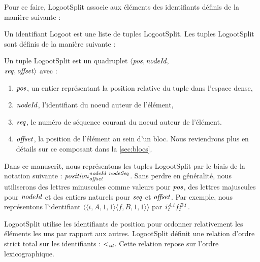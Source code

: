 Pour ce faire, LogootSplit associe aux éléments des identifiants définis de la manière suivante :

\begin{definition}
  Un identifiant Logoot est une liste de tuples LogootSplit.
  Les tuples LogootSplit sont définis de la manière suivante :
  \begin{subdefinition}
    Un tuple LogootSplit est un quadruplet $\langle \mathit{pos},\mathit{nodeId},$ \\
    $\mathit{seq},\mathit{offset} \rangle$ avec :
    \begin{enumerate}
      \item $\mathit{pos}$, un entier représentant la position relative du tuple dans l'espace dense,
      \item $\mathit{nodeId}$, l'identifiant du noeud auteur de l'élément,
      \item $\mathit{seq}$, le numéro de séquence courant du noeud auteur de l'élément.
      \item $\mathit{offset}$, la position de l'élément au sein d'un bloc. Nous reviendrons plus en détails sur ce composant dans la \autoref{sec:blocs}.
    \end{enumerate}
  \end{subdefinition}
\end{definition}

Dans ce manuscrit, nous représentons les tuples LogootSplit par le biais de la notation suivante : $\mathit{position}^{\mathit{nodeId~nodeSeq}}_{\mathit{offset}}$.
Sans perdre en généralité, nous utiliserons des lettres minuscules comme valeurs pour $\mathit{pos}$, des lettres majuscules pour $\mathit{nodeId}$ et des entiers naturels pour $\mathit{seq}$ et $\mathit{offset}$.
Par exemple, nous représentons l'identifiant $\langle \langle i,A,1,1 \rangle \langle f,B,1,1 \rangle \rangle$ par $\mathit{i}^{\mathit{A1}}_{\mathit{1}}\mathit{f}^{\mathit{B1}}_{\mathit{1}}$.

LogootSplit utilise les identifiants de position pour ordonner relativement les éléments les uns par rapport aux autres.
LogootSplit définit une relation d'ordre strict total sur les identifiants : $<_{id}$.
Cette relation repose sur l'ordre lexicographique.

